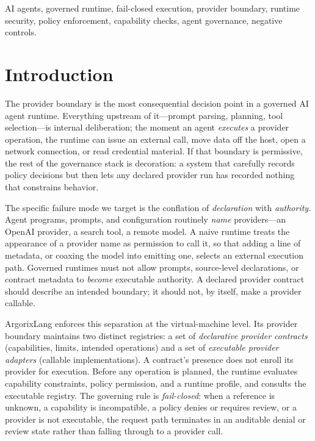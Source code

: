 \documentclass[conference]{IEEEtran}
\newcommand{\Argorix}{%
\textcolor{argViolet}{A}\textcolor{argViolet}{r}\textcolor{argIndigo}{g}\textcolor{argIndigo}{o}\textcolor{argElectric}{r}\textcolor{argElectric}{i}\textcolor{argElectric}{x}\textcolor{argCyan}{L}\textcolor{argCyan}{a}\textcolor{argCyanBright}{n}\textcolor{argCyanBright}{g}\xspace}
\begin{document}
\begin{IEEEkeywords}
AI agents, governed runtime, fail-closed execution, provider boundary, runtime security,
policy enforcement, capability checks, agent governance, negative controls.
\end{IEEEkeywords}

\section{Introduction}\label{sec:intro}
The provider boundary is the most consequential decision point in a governed AI agent
runtime. Everything upstream of it---prompt parsing, planning, tool selection---is
internal deliberation; the moment an agent \emph{executes} a provider operation, the
runtime can issue an external call, move data off the host, open a network connection, or
read credential material. If that boundary is permissive, the rest of the governance stack
is decoration: a system that carefully records policy decisions but then lets any declared
provider run has recorded nothing that constrains behavior.

The specific failure mode we target is the conflation of \emph{declaration} with
\emph{authority}. Agent programs, prompts, and configuration routinely \emph{name}
providers---an OpenAI provider, a search tool, a remote model. A naive runtime treats the
appearance of a provider name as permission to call it, so that adding a line of metadata,
or coaxing the model into emitting one, selects an external execution path. Governed
runtimes must not allow prompts, source-level declarations, or contract metadata to
\emph{become} executable authority. A declared provider contract should describe an
intended boundary; it should not, by itself, make a provider callable.

\Argorix \cite{venegas2026argorixlang,argorixlang2026} enforces this separation at the
virtual-machine level. Its provider boundary maintains two distinct registries: a set of
\emph{declarative provider contracts} (capabilities, limits, intended operations) and a
set of \emph{executable provider adapters} (callable implementations). A contract's
presence does not enroll its provider for execution. Before any operation is planned, the
runtime evaluates capability constraints, policy permission, and a runtime profile, and
consults the executable registry. The governing rule is \emph{fail-closed}: when a
reference is unknown, a capability is incompatible, a policy denies or requires review, or
a provider is not executable, the request path terminates in an auditable denial or review
state rather than falling through to a provider call.
\end{document}
